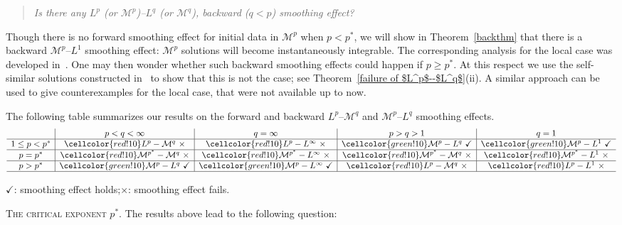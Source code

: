 \documentclass[leqno,12pt]{amsart}
\theoremstyle{definition}
\theoremstyle{remark}
\numberwithin{equation}{section}
\begin{document}
\begin{quote}
    \centering
    \emph{Is there any $L^p$ (or $\mathcal{M}^p$)--$L^q$ (or $\mathcal{M}^q$), backward ($q<p$) smoothing effect?}  
\end{quote}

Though there is no forward smoothing effect for initial data in $\mathcal{M}^{p}$ when $p< p^*$, we will show in Theorem~\ref{backthm} that there is a backward $\mathcal{M}^{p}$--$L^1$ smoothing effect: $\mathcal{M}^p$ solutions will become instantaneously integrable. The corresponding analysis for the local case was developed in~\cite{smoothbook}.  One may then wonder whether such backward smoothing effects could happen if $p\ge p^*$.  At this respect we use the self-similar solutions constructed in~\cite{vazquez:Mp_SE} to show that this is not the case; see Theorem~\ref{failure of $L^p$--$L^q$}(ii). A similar approach can be used to give counterexamples for the local case, that were not available up to now.


The following table summarizes our results on the forward and backward 
\(L^p\)–\(\mathcal{M}^q\) and \(\mathcal{M}^p\)–\(L^q\)  smoothing effects. 
\renewcommand{\arraystretch}{2}
\[
\begin{array}{c|c|c|c|c}
 & p<q<\infty & q=\infty & p>q>1 & q=1\\
\hline
1\le p<p^{*}
& \cellcolor{red!10} L^{p}-\mathcal{M}^{q}\ \times
& \cellcolor{red!10} L^{p}-L^{\infty}\ \times
& \cellcolor{green!10} \mathcal{M}^{p}-L^{q}\ \checkmark
& \cellcolor{green!10}\mathcal{M}^{p}-L^{1}\ \checkmark
\\
\hline
p=p^{*}
& \cellcolor{red!10} \mathcal{M}^{p^*}-\mathcal{M}^{q}\ \times
& \cellcolor{red!10} \mathcal{M}^{p^*}-L^{\infty}\ \times
& \cellcolor{red!10} \mathcal{M}^{p^*}-\mathcal{M}^{q}\ \times
& \cellcolor{red!10} \mathcal{M}^{p^*}-L^{1}\ \times
\\
\hline
p>p^{*}
& \cellcolor{green!10} \mathcal{M}^{p}-L^{q}\ \checkmark
& \cellcolor{green!10}\mathcal{M}^{p}-L^{\infty}\ \checkmark
& \cellcolor{red!10} L^{p}-\mathcal{M}^{q}\ \times
& \cellcolor{red!10} L^{p}-L^{1}\ \times
\\
\hline
\end{array}
\]

\smallskip

\centerline{\small $\checkmark$: smoothing effect holds;\quad $\times$: smoothing effect fails.}

\medskip 

\noindent\textsc{The critical exponent $p^*$. } The results above lead to the following question:
\end{document}
